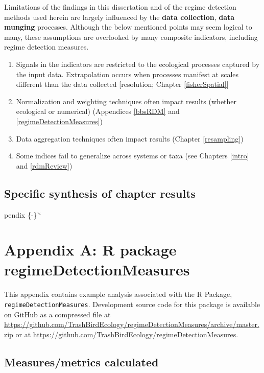 \documentclass[12pt,twoside,openany]{reedthesis}
\providecommand{\tightlist}{%
  \setlength{\itemsep}{0pt}\setlength{\parskip}{0pt}}
\begin{document}
Limitations of the findings in this dissertation and of the regime detection methods used herein are largely influenced by the \textbf{data collection}, \textbf{data munging} processes. Although the below mentioned points may seem logical to many, these assumptions are overlooked by many composite indicators, including regime detection measures.
\begin{enumerate}
\def\labelenumi{\arabic{enumi}.}
\tightlist
\item
  Signals in the indicators are restricted to the ecological processes captured by the input data. Extrapolation occurs when processes manifest at scales different than the data collected {[}resolution; Chapter \ref{fisherSpatial}{]}\\
\item
  Normalization and weighting techniques often impact results (whether ecological or numerical) (Appendices \ref{bbsRDM} and \ref{regimeDetectionMeasures})\\
\item
  Data aggregation techniques often impact results (Chapter \ref{resampling})\\
\item
  Some indices fail to generalize across systems or taxa (see Chapters \ref{intro} and \ref{rdmReview})
\end{enumerate}
\hypertarget{specific-synthesis-of-chapter-results}{%
\section{Specific synthesis of chapter results}\label{specific-synthesis-of-chapter-results}}

pendix \{-\}'`

\hypertarget{regimeDetectionMeasures}{%
\chapter*{Appendix A: R package regimeDetectionMeasures}\label{regimeDetectionMeasures}}

This appendix contains example analysis associated with the R Package, \texttt{regimeDetectionMeasures}. Development source code for this package is available on GitHub as a compressed file at \url{https://github.com/TrashBirdEcology/regimeDetectionMeasures/archive/master.zip} or at \url{https://github.com/TrashBirdEcology/regimeDetectionMeasures}.

\hypertarget{measuresmetrics-calculated}{%
\section{Measures/metrics calculated}\label{measuresmetrics-calculated}}
\end{document}
